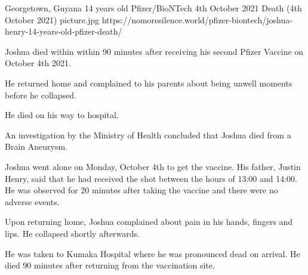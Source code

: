 {Georgetown, Guyana}
{14 years old}
{Pfizer/BioNTech}
{4th October 2021}
{Death (4th October 2021)}
{picture.jpg}
{https://nomoresilence.world/pfizer-biontech/joshua-henry-14-years-old-pfizer-death/}
{

Joshua died within within 90 minutes after receiving his second Pfizer Vaccine
on October 4th 2021.

He returned home and complained to his parents about being unwell moments before
he collapsed.

He died on his way to hospital.

An investigation by the Ministry of Health concluded that Joshua died from a
Brain Aneurysm.

Joshua went alone on Monday, October 4th to get the vaccine. His father, Justin
Henry, said that he had received the shot between the hours of 13:00 and
14:00. He was observed for 20 minutes after taking the vaccine and there were no
adverse events.

Upon returning home, Joshua complained about pain in his hands, fingers and
lips. He collapsed shortly afterwards.

He was taken to Kumaka Hospital where he was pronounced dead on arrival. He died
90 minutes after returning from the vaccination site.

}
